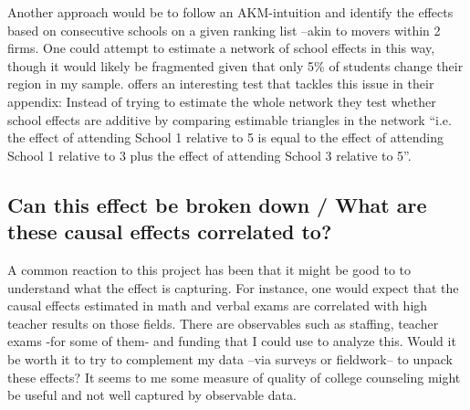 \documentclass[12pt]{article}
\begin{document}
Another approach would be to follow an AKM-intuition \parencite{abowd_high_1999} and identify the effects based on consecutive schools on a given ranking list --akin to movers within 2 firms. One could attempt to estimate a network of school effects in this way, though it would likely be fragmented given that only 5\% of students change their region in my sample. \textcite{beuermann_what_2023} offers an interesting test that tackles this issue in their appendix: Instead of trying to estimate the whole network they test whether school effects are additive by comparing estimable triangles in the network  ``i.e. the effect of attending School 1 relative to 5 is equal to the effect of attending School 1 relative to 3 plus the effect of attending School 3 relative to 5''. 





\subsection{Can this effect be broken down / What are these causal effects correlated to? }

A common reaction to this project has been that it might be good to to understand what the effect is capturing. For instance, one would expect that the causal effects estimated in math and verbal exams are correlated with high teacher results on those fields. There are observables such as staffing, teacher exams -for some of them- and funding that I could use to analyze this. Would it be worth it to try to complement my data --via surveys or fieldwork-- to unpack these effects? It seems to me some measure of quality of college counseling might be useful and not well captured by observable data.
\end{document}

